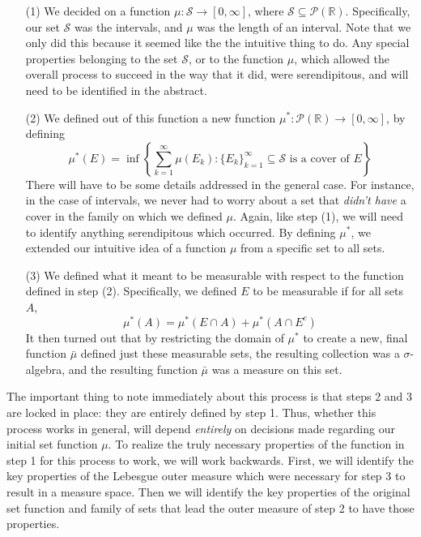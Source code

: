 \documentclass{article}
\theoremstyle{definition}
\theoremstyle{plain}
\theoremstyle{theorem}
\begin{document}
\begin{itemize}
	\item[(1)] We decided on a function $\mu:\mathcal{S} \to [0,\infty]$, where $\mathcal{S} \subseteq \mathcal{P}(\mathbb{R})$. Specifically, our set $\mathcal{S}$ was the intervals, and $\mu$ was the length of an interval. Note that we only did this because it seemed like the the intuitive thing to do. Any special properties belonging to the set $\mathcal{S}$, or to the function $\mu$, which allowed the overall process to succeed in the way that it did, were serendipitous, and will need to be identified in the abstract.
	\item[(2)] We defined out of this function a new function $\mu^*:\mathcal{P}(\mathbb{R}) \to [0,\infty]$, by defining 
	\[ \mu^*(E) = \inf \left\{\sum_{k=1}^{\infty} \mu(E_k): \{E_k\}_{k =1}^{\infty} \subseteq \mathcal{S} \textrm{ is a cover of $E$}  \right\} \]
There will have to be some details addressed in the general case. For instance, in the case of intervals, we never had to worry about a set that \textit{didn't have} a cover in the family on which we defined $\mu$. Again, like step (1), we will need to identify anything serendipitous which occurred. By defining $\mu^*$, we extended our intuitive idea of a function $\mu$ from a specific set to all sets.
	\item[(3)] We defined what it meant to be measurable with respect to the function defined in step (2). Specifically, we defined $E$ to be measurable if for all sets $A$,
	\[ \mu^*(A) = \mu^*(E \cap A) + \mu^*(A \cap E^c) \]
It then turned out that by restricting the domain of $\mu^*$ to create a new, final function $\bar{\mu}$ defined just these measurable sets, the resulting collection was a $\sigma$-algebra, and the resulting function $\bar{\mu}$ was a measure on this set. 
\end{itemize}
The important thing to note immediately about this process is that steps 2 and 3 are locked in place: they are entirely defined by step 1. Thus, whether this process works in general, will depend \textit{entirely} on decisions made regarding our initial set function $\mu$. To realize the truly necessary properties of the function in step 1 for this process to work, we will work backwards. First, we will identify the key properties of the Lebesgue outer measure which were necessary for step 3 to result in a measure space. Then we will identify the key properties of the original set function and family of sets that lead the outer measure of step 2 to have those properties. \par 
\end{document}
